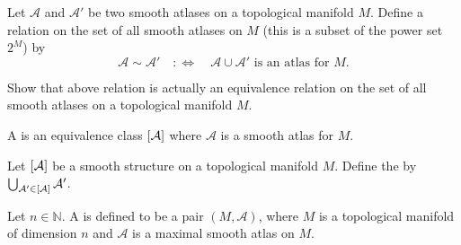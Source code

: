 Let $\mathcal{A}$ and $\mathcal{A}'$ be two smooth atlases on a topological manifold $M$. Define a relation on the set of all smooth atlases on $M$ (this is a subset of the power set $2^M$) by
\begin{equation*}
	\mathcal{A} \sim \mathcal{A}' \quad :\Leftrightarrow \quad \mathcal{A} \cup \mathcal{A}' \text{ is an atlas for } M.
\end{equation*}

\begin{exercise}
	Show that above relation is actually an equivalence relation on the set of all smooth atlases on a topological manifold $M$.
\end{exercise}

\begin{definition}
	A  is an equivalence class $\sbr[0]{\mathcal{A}}$ where $\mathcal{A}$ is a smooth atlas for $M$.
\end{definition}

\begin{definition}
	Let $\sbr[0]{\mathcal{A}}$ be a smooth structure on a topological manifold $M$. Define the  by $\bigcup_{\mathcal{A}' \in \sbr[0]{\mathcal{A}}} \mathcal{A}'$.
\end{definition}

\begin{definition}
	Let $n \in \mathbb{N}$. A  is defined to be a pair $(M,\mathcal{A})$, where $M$ is a topological manifold of dimension $n$ and $\mathcal{A}$ is a maximal smooth atlas on $M$.
\end{definition}

